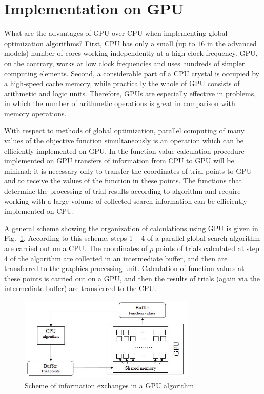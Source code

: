 \documentclass[smallcondensed]{svjour3}     %
\begin{document}
\section{Implementation on GPU} \label{sec:5}

What are the advantages of GPU over CPU when implementing global optimization algorithms? First, CPU has only a small (up to $16$ in the advanced models) number of cores working independently at a high clock frequency. GPU, on the contrary, works at low clock frequencies and uses hundreds of simpler computing elements. Second, a considerable part of a CPU crystal is occupied by a high-speed cache memory, while practically the whole of GPU consists of arithmetic and logic units. Therefore, GPUs are especially effective in problems, in which the number of arithmetic operations is great in comparison with memory operations.

With respect to methods of global optimization, parallel computing of many values of the objective function simultaneously is an operation which can be efficiently implemented on GPU. In the function value calculation procedure implemented on GPU transfers of information from CPU to GPU will be minimal: it is necessary only to transfer the coordinates of trial points to GPU and to receive the values of the function in these points. The functions that determine the processing of trial results according to algorithm and require working with a large volume of collected search information can be efficiently implemented on CPU.

A general scheme showing the organization of calculations using GPU is given in Fig.~\ref{fig:3}. According to this scheme, steps 1 -- 4 of a parallel global search algorithm are carried out on a CPU. The coordinates of $p$ points of trials calculated at step 4 of the algorithm are collected in an intermediate buffer, and then are transferred to the graphics processing unit. Calculation of function values at these points is carried out on a GPU, and then the results of trials (again via the intermediate buffer) are transferred to the CPU.

\begin{figure}
	\center
  \includegraphics[width=0.75\textwidth]{fig4.jpg} 
  \caption{Scheme of information exchanges in a GPU algorithm}
  \label{fig:3}
\end{figure}
\end{document}
